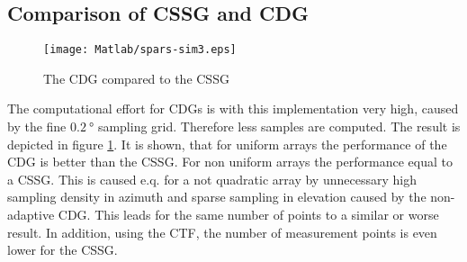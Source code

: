 \subsection{Comparison of CSSG and CDG}

\begin{figure}[h]
\centering
\texttt{[image: Matlab/spars-sim3.eps]}
\caption{The CDG compared to the CSSG}
\label{fig:cdg}
\end{figure}

The computational effort for \acp{CDG} is with this implementation very high, caused by the fine $\SI{0.2}{\degree}$ sampling grid. Therefore less samples are computed. The result is depicted in figure \ref{fig:cdg}. It is shown, that for uniform arrays the performance of the \ac{CDG} is better than the \ac{CSSG}. For non uniform arrays the performance equal to a \ac{CSSG}. This is caused e.q. for a not quadratic array by unnecessary high sampling density in azimuth and sparse sampling in elevation caused by the non-adaptive \ac{CDG}. This leads for the same number of points to a similar or worse result. In addition, using the \ac{CTF}, the number of measurement points is even lower for the \ac{CSSG}.



